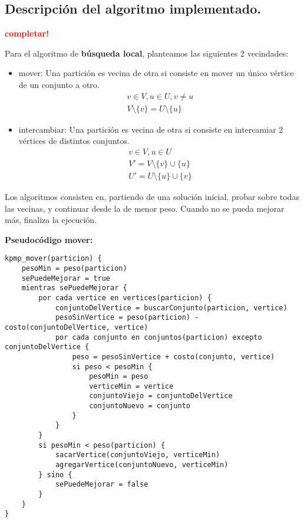 \subsection{Descripción del algoritmo implementado.}
\vspace*{0.3cm}
\textcolor{red}{\textbf{completar!}}

Para el algoritmo de \textbf{búsqueda local}, planteamos las siguientes 2 vecindades:

\begin{itemize}
    \item mover: Una partición es vecina de otra si consiste en mover un único vértice de un conjunto a otro.
    \begin{align*}
        v \in V, u \in U, v \ne u \\
        V \setminus \{v\} = U \setminus \{u\}
    \end{align*}

    \item intercambiar: Una partición es vecina de otra si consiste en intercamiar 2 vértices de distintos conjuntos.
    \begin{align*}
        v \in V, u \in U \\
        V' = V \setminus \{v\} \cup \{u\} \\
        U' = U \setminus \{u\} \cup \{v\}
    \end{align*}
\end{itemize}

Los algoritmos consisten en, partiendo de una solución inicial, probar sobre todas las vecinas, y continuar desde la de menor peso. Cuando no se pueda mejorar más, finaliza la ejecución.

\vspace*{0.5cm}

\textbf{Pseudocódigo mover:}

\vspace*{0.3cm}

\begin{verbatim}
kpmp_mover(particion) {
    pesoMin = peso(particion)
    sePuedeMejorar = true
    mientras sePuedeMejorar {
        por cada vertice en vertices(particion) {
            conjuntoDelVertice = buscarConjunto(particion, vertice)
            pesoSinVertice = peso(particion) - costo(conjuntoDelVertice, vertice)
            por cada conjunto en conjuntos(particion) excepto conjuntoDelVertice {
                peso = pesoSinVertice + costo(conjunto, vertice)
                si peso < pesoMin {
                    pesoMin = peso
                    verticeMin = vertice
                    conjuntoViejo = conjuntoDelVertice
                    conjuntoNuevo = conjunto
                }
            }
        }
        si pesoMin < peso(particion) {
            sacarVertice(conjuntoViejo, verticeMin)
            agregarVertice(conjuntoNuevo, verticeMin)
        } sino {
            sePuedeMejorar = false
        }
    }
}
\end{verbatim}

